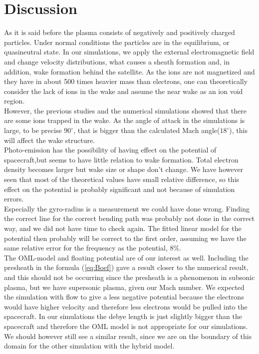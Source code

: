 \documentclass[aip, 
rsi, 
amsmath,
amssymb,
longbibliography,
preprint]{revtex4-1}
\begin{document}
\section{Discussion}

As it is said before the plasma consists of negatively and positively charged particles. Under normal conditions the particles are in the equilibrium, or quasineutral state. In our simulations, we apply the external electromagnetic field and change velocity distributions, what causes a sheath formation and, in addition, wake formation behind the satellite. As the ions are not magnetized and they have in about 500 times heavier mass than electrons, one can theoretically consider the lack of ions in the wake and assume the near wake as an ion void region.\\

However, the previous studies \cite{P1} and the numerical simulations showed that there are some ions trapped in the wake. As the angle of attack in the simulations is large, to be precise $90^{\circ}$, that is bigger than the calculated Mach angle($18^{\circ}$), this will affect the wake structure.\\

Photo-emission has the possibility of having effect on the potential of spacecraft,but seems to have little relation to wake formation. Total electron density becomes larger but wake size or shape don't change. We have however seen that most of the theoretical values have small relative difference, so this effect on the potential is probably significant and not because of simulation errors.\\

Especially the gyro-radius is a measurement we could have done wrong. Finding the correct line for the correct bending path was probably not done in the correct way, and we did not have time to check again. The fitted linear model for the potential then probably will be correct to the first order, assuming we have the same relative error for the frequency as the potential, $8\%$.\\

The OML-model and floating potential are of our interest as well. Including the presheath in the formula (\ref{eq:Boef}) gave a result closer to the numerical result, and this should not be occurring since the presheath is a phenomenon in subsonic plasma, but we have supersonic plasma, given our Mach number. We expected the simulation with flow to give a less negative potential because the electrons would have higher velocity and therefore less electrons would be pulled into the spacecraft. In our simulations the debye length is just slightly bigger than the spacecraft and therefore the OML model is not appropriate for our simulations. We should however still see a similar result, since we are on the boundary of this domain for the other simulation with the hybrid model\cite{P7}.\\
\end{document}
